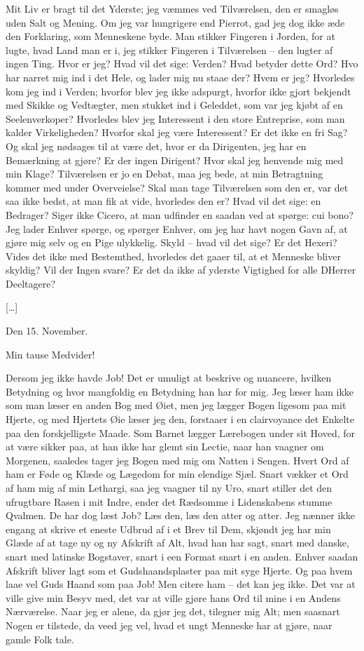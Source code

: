 \documentclass[12pt,a4paper]{article}
\begin{document}
Mit Liv er bragt til det Yderste; jeg væmmes ved Tilværelsen, den er smagløs uden Salt og Mening. Om jeg var hungrigere end Pierrot, gad jeg dog ikke æde den Forklaring, som Menneskene byde. Man stikker Fingeren i Jorden, for at lugte, hvad Land man er i, jeg stikker Fingeren i Tilværelsen – den lugter af ingen Ting. Hvor er jeg? Hvad vil det sige: Verden? Hvad betyder dette Ord? Hvo har narret mig ind i det Hele, og lader mig nu staae der? Hvem er jeg? Hvorledes kom jeg ind i Verden; hvorfor blev jeg ikke adspurgt, hvorfor ikke gjort bekjendt med Skikke og Vedtægter, men stukket ind i Geleddet, som var jeg kjøbt af en Seelenverkoper? Hvorledes blev jeg Interessent i den store Entreprise, som man kalder Virkeligheden? Hvorfor skal jeg være Interessent? Er det ikke en fri Sag? Og skal jeg nødsages til at være det, hvor er da Dirigenten, jeg har en Bemærkning at gjøre? Er der ingen Dirigent? Hvor skal jeg henvende mig med min Klage? Tilværelsen er jo en Debat, maa jeg bede, at min Betragtning kommer med under Overveielse? Skal man tage Tilværelsen som den er, var det saa ikke bedst, at man fik at vide, hvorledes den er? Hvad vil det sige: en Bedrager? Siger ikke Cicero, at man udfinder en saadan ved at spørge: cui bono? Jeg lader Enhver spørge, og spørger Enhver, om jeg har havt nogen Gavn af, at gjøre mig selv og en Pige ulykkelig. Skyld – hvad vil det sige? Er det Hexeri? Vides det ikke med Bestemthed, hvorledes det gaaer til, at et Menneske bliver skyldig? Vil der Ingen svare? Er det da ikke af yderste Vigtighed for alle DHerrer Deeltagere?

[…]

Den 15. November.

Min tause Medvider!

Dersom jeg ikke havde Job! Det er umuligt at beskrive og nuancere, hvilken Betydning og hvor mangfoldig en Betydning han har for mig. Jeg læser ham ikke som man læser en anden Bog med Øiet, men jeg lægger Bogen ligesom paa mit Hjerte, og med Hjertets Øie læser jeg den, forstaaer i en clairvoyance det Enkelte paa den forskjelligste Maade. Som Barnet lægger Lærebogen under sit Hoved, for at være sikker paa, at han ikke har glemt sin Lectie, naar han vaagner om Morgenen, saaledes tager jeg Bogen med mig om Natten i Sengen. Hvert Ord af ham er Føde og Klæde og Lægedom for min elendige Sjæl. Snart vækker et Ord af ham mig af min Lethargi, saa jeg vaagner til ny Uro, snart stiller det den ufrugtbare Rasen i mit Indre, ender det Rædsomme i Lidenskabens stumme Qvalmen. De har dog læst Job? Læs den, læs den atter og atter. Jeg nænner ikke engang at skrive et eneste Udbrud af i et Brev til Dem, skjøndt jeg har min Glæde af at tage ny og ny Afskrift af Alt, hvad han har sagt, snart med danske, snart med latinske Bogstaver, snart i een Format snart i en anden. Enhver saadan Afskrift bliver lagt som et Gudshaandsplaster paa mit syge Hjerte. Og paa hvem laae vel Guds Haand som paa Job! Men citere ham – det kan jeg ikke. Det var at ville give min Besyv med, det var at ville gjøre hans Ord til mine i en Andens Nærværelse. Naar jeg er alene, da gjør jeg det, tilegner mig Alt; men saasnart Nogen er tilstede, da veed jeg vel, hvad et ungt Menneske har at gjøre, naar gamle Folk tale.
\end{document}
